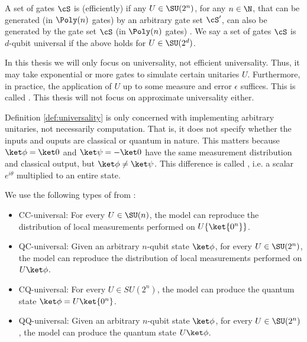 \begin{definition}
\label{def:universality}
A set of gates $\cS$ is (efficiently)  if any $U \in \SU(2^n)$, for any $n \in \N$, that can be generated (in $\Poly(n)$ gates) by an arbitrary gate set $\cS'$, can also be generated by the gate set $\cS$ (in $\Poly(n)$ gates) \cite{MBQC-universal}. We say a set of gates $\cS$ is $d$-qubit universal if the above holds for $U \in \SU(2^d)$.
\end{definition}

\begin{remark}
In this thesis we will only focus on universality, not efficient universality. Thus, it may take exponential or more gates to simulate certain unitaries $U$. Furthermore, in practice, the application of $U$ up to some measure and error $\epsilon$ suffices. This is called . This thesis will not focus on approximate universality either.
\end{remark}

\begin{remark}
Definition \ref{def:universality} is only concerned with implementing arbitrary unitaries, not necessarily computation. That is, it does not specify whether the inputs and ouputs are classical or quantum in nature. This matters because $\ket\phi = \ket0$ and $\ket\psi = -\ket0$ have the same measurement distribution and classical output, but $\ket\phi \neq \ket\psi$. This difference is called , i.e. a scalar $e^{i\theta}$ multiplied to an entire state.
\end{remark}

\begin{definition}
We use the following types of  from \cite{MBQC-universal}:
\begin{itemize}
    \item CC-universal: For every $U \in \SU(n)$, the model can reproduce the distribution of local measurements performed on $U \{\ket{0^n}\}$.
    \item QC-universal: Given an arbitrary $n$-qubit state $\ket\phi$, for every $U \in \SU(2^n)$, the model can reproduce the distribution of local measurements performed on $U \ket\phi$.
    \item CQ-universal: For every $U \in SU(2^n)$, the model can produce the quantum state $\ket\phi = U\ket{0^n}$.
    \item QQ-universal: Given an arbitrary $n$-qubit state $\ket\phi$, for every $U \in \SU(2^n)$, the model can produce the quantum state $U \ket\phi$.
\end{itemize}
\end{definition}

